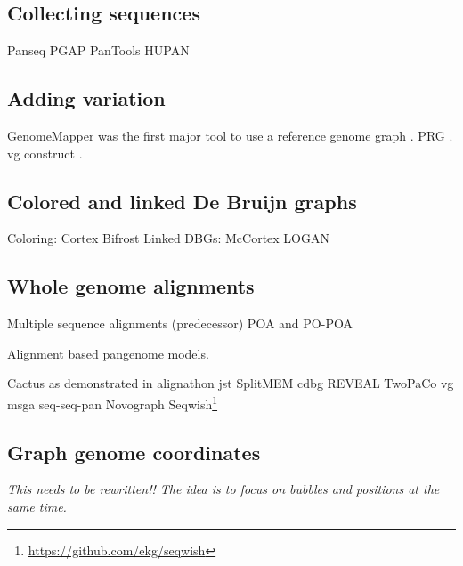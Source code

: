 \subsection{Collecting sequences}

Panseq \cite{Laing_2010}
PGAP \cite{Zhao_2011}
PanTools  \cite{Sheikhizadeh_Anari_2018}
HUPAN \citep{Duan_2019}

\subsection{Adding variation}

GenomeMapper was the first major tool to use a reference genome graph \cite{Schneeberger_2009}.
PRG \cite{dilthey2015improved}.
vg construct \cite{Garrison_2018}.

\subsection{Colored and linked De Bruijn graphs}

Coloring:
Cortex \cite{Iqbal_2012}
Bifrost \cite{holley2019bifrost}
Linked DBGs:
McCortex \cite{Turner_2018}
LOGAN \cite{Bolger_2017}

\subsection{Whole genome alignments}

Multiple sequence alignments (predecessor) POA and PO-POA \cite{Lee_2002,Grasso_2004} %

Alignment based pangenome models.

Cactus \cite{Paten_2p011} as demonstrated in alignathon \cite{earl2014alignathon}
jst \cite{Rahn_2014}
SplitMEM \cite{Marcus_2014}
cdbg \cite{Baier_2015}
REVEAL \cite{linthorst2015scalable}
TwoPaCo \cite{Minkin_2016}
vg msga \cite{Novak_2017a,Garrison_2018,Garrison_2019}
seq-seq-pan \cite{Jandrasits_2018}
Novograph \cite{Biederstedt2018}
Seqwish\footnote{\url{https://github.com/ekg/seqwish}} \cite{Garrison_2019}


\subsection{Graph genome coordinates}

\textit{This needs to be rewritten!! The idea is to focus on bubbles and positions at the same time.} \cite{Rand_2016}

